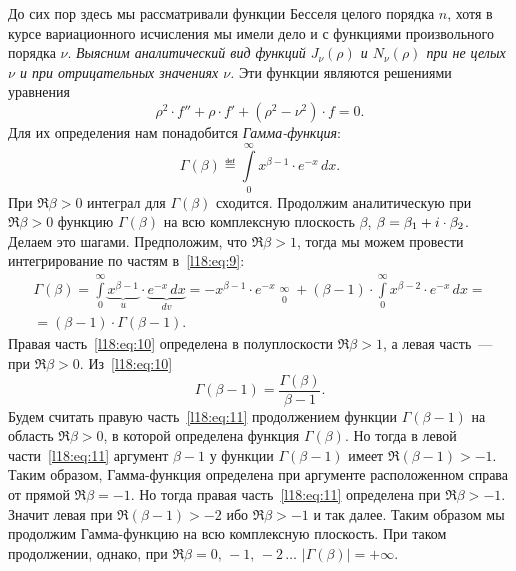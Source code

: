 До сих пор здесь мы рассматривали функции Бесселя целого порядка $n$, хотя в курсе вариационного исчисления мы имели дело и с функциями произвольного порядка $\nu$. \emph{Выясним аналитический вид функций $J_{\nu}(\rho)$ и $N_{\nu}(\rho)$ при не целых $\nu$ и при отрицательных значениях $\nu$.} Эти функции являются решениями уравнения 
\begin{equation}\label{l18:eq:8}
	\rho^2\cdot f''+\rho\cdot f'+(\rho^2-\nu^2)\cdot f=0.
\end{equation} 
Для их определения нам понадобится \emph{Гамма-функция}:
\begin{equation}\label{l18:eq:9}
	\Gamma(\beta)\eqdef\int\limits_{0}^{\infty}x^{\beta-1}\cdot e^{-x}\,dx.
\end{equation}
При $\Re\beta>0$ интеграл для $\Gamma(\beta)$ сходится. Продолжим аналитическую при $\Re\beta>0$ функцию $\Gamma(\beta)$ на всю комплексную плоскость $\beta$, $\beta\?=\beta_1+i\cdot\beta_2$. Делаем это шагами. Предположим, что $\Re\beta>1$, тогда мы можем провести интегрирование по частям в~\eqref{l18:eq:9}:
\begin{multline}\label{l18:eq:10}
	\Gamma(\beta)=\int\limits_{0}^{\infty}\underbrace{x^{\beta-1}}_{u}\cdot \underbrace{e^{-x}\,dx}_{dv}=-x^{\beta-1}\cdot e^{-x}\mathop{\Big|}\limits_{0}^{\infty}+(\beta-1)\cdot\int\limits_{0}^{\infty}x^{\beta-2}\cdot e^{-x}\,dx=\\=(\beta-1)\cdot\Gamma(\beta-1).
\end{multline}
Правая часть~\eqref{l18:eq:10} определена в полуплоскости $\Re\beta>1$, а левая часть~--- при $\Re\beta>0$. Из~\eqref{l18:eq:10}
\begin{equation}\label{l18:eq:11}
	\Gamma(\beta-1)=\frac{\Gamma(\beta)}{\beta-1}.
\end{equation}
Будем считать правую часть~\eqref{l18:eq:11} продолжением функции $\Gamma(\beta-1)$ на область $\Re\beta>0$, в которой определена функция $\Gamma(\beta)$. Но тогда в левой части~\eqref{l18:eq:11} аргумент $\beta-1$ у функции $\Gamma(\beta-1)$ имеет $\Re(\beta-1)>-1$. Таким образом, Гамма-функция определена при аргументе расположенном справа от прямой $\Re\beta=-1$. Но тогда правая часть~\eqref{l18:eq:11} определена при $\Re\beta>-1$. Значит левая при $\Re(\beta-1)>-2$ ибо $\Re\beta>-1$ и так далее. Таким образом мы продолжим Гамма-функцию на всю комплексную плоскость. При таком продолжении, однако, при $\Re\beta=0,\,-1,\,-2\,\ldots$ $|\Gamma(\beta)|=+\infty$. 

